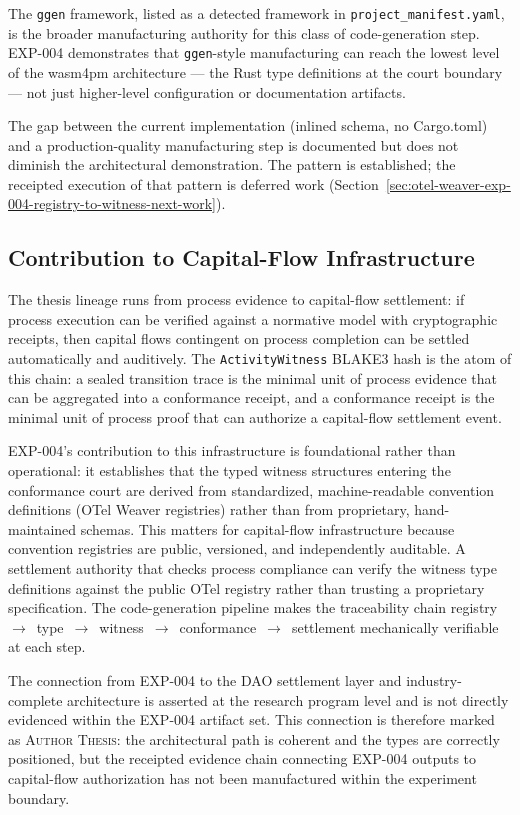 The \texttt{ggen} framework, listed as a detected framework in \texttt{project\_manifest.yaml},
is the broader manufacturing authority for this class of code-generation step. EXP-004
demonstrates that \texttt{ggen}-style manufacturing can reach the lowest level of the
wasm4pm architecture --- the Rust type definitions at the court boundary --- not just
higher-level configuration or documentation artifacts.

The gap between the current implementation (inlined schema, no Cargo.toml) and a
production-quality manufacturing step is documented but does not diminish the
architectural demonstration. The pattern is established; the receipted execution of that
pattern is deferred work
(Section~\ref{sec:otel-weaver-exp-004-registry-to-witness-next-work}).

\subsection{Contribution to Capital-Flow Infrastructure}
\label{sec:otel-weaver-exp-004-registry-to-witness-capital-flow}

The thesis lineage runs from process evidence to capital-flow settlement: if process
execution can be verified against a normative model with cryptographic receipts, then
capital flows contingent on process completion can be settled automatically and
auditively. The \texttt{ActivityWitness} BLAKE3 hash is the atom of this chain: a sealed
transition trace is the minimal unit of process evidence that can be aggregated into a
conformance receipt, and a conformance receipt is the minimal unit of process proof that
can authorize a capital-flow settlement event.

EXP-004's contribution to this infrastructure is foundational rather than operational: it
establishes that the typed witness structures entering the conformance court are derived
from standardized, machine-readable convention definitions (OTel Weaver registries) rather
than from proprietary, hand-maintained schemas. This matters for capital-flow
infrastructure because convention registries are public, versioned, and independently
auditable. A settlement authority that checks process compliance can verify the witness
type definitions against the public OTel registry rather than trusting a proprietary
specification. The code-generation pipeline makes the traceability chain
registry~$\to$~type~$\to$~witness~$\to$~conformance~$\to$~settlement mechanically
verifiable at each step.

The connection from EXP-004 to the DAO settlement layer and industry-complete architecture
is asserted at the research program level and is not directly evidenced within the
EXP-004 artifact set. This connection is therefore marked as \textsc{Author Thesis}: the
architectural path is coherent and the types are correctly positioned, but the receipted
evidence chain connecting EXP-004 outputs to capital-flow authorization has not been
manufactured within the experiment boundary.
